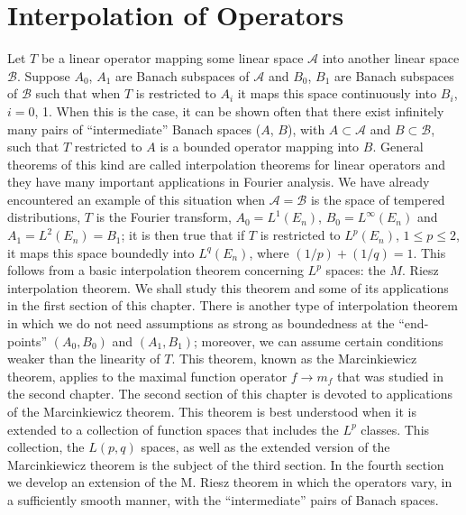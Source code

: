 \chapter{Interpolation of Operators}

Let $T$ be a linear operator mapping some linear space $\mathcal{A}$ into
another linear space $\mathcal{B}$. Suppose $A_{0}$, $A_{1}$ are Banach
subspaces of $\mathcal{A}$ and $B_{0}$, $B_{1}$ are Banach subspaces of
$\mathcal{B}$ such that when $T$ is restricted to $A_{i}$ it maps this space
continuously into $B_{i}$, $i = 0$, 1. When this is the case, it can be shown
often that there exist infinitely many pairs of ``intermediate'' Banach spaces
($A$, $B$), with $A \subset \mathcal{A}$ and $B \subset \mathcal{B}$, such that
$T$ restricted to $A$ is a bounded operator mapping into $B$. General theorems
of this kind are called interpolation theorems for linear operators and they
have many important applications in Fourier analysis. We have already
encountered an example of this situation when $\mathcal{A} = \mathcal{B}$ is
the space of tempered distributions, $T$ is the Fourier transform,
$A_{0} = L^{1}(E_{n})$, $B_{0} = L^{\infty}(E_{n})$ and
$A_{1} = L^{2}(E_{n}) = B_{1}$; it is then true that if $T$ is restricted to
$L^{p}(E_{n})$, $1 \leq p \leq 2$, it maps this space boundedly into
$L^{q}(E_{n})$, where $(1/p) + (1/q) = 1$. This follows from a basic
interpolation theorem concerning $L^{p}$ spaces: the $M$. Riesz interpolation
theorem. We shall study this theorem and some of its applications in the first
section of this chapter. There is another type of interpolation theorem in
which we do not need assumptions as strong as boundedness at the
``end-points'' $(A_{0}, B_{0})$ and $(A_{1}, B_{1})$; moreover, we can assume
certain conditions weaker than the linearity of $T$. This theorem, known as the
Marcinkiewicz theorem, applies to the maximal function operator $f \to m_{f}$
that was studied in the second chapter. The second section of this chapter is
devoted to applications of the Marcinkiewicz theorem. This theorem is best
understood when it is extended to a collection of function spaces that
includes the $L^{p}$ classes. This collection, the $L(p, q)$ spaces, as well as
the extended version of the Marcinkiewicz theorem is the subject of the third
section. In the fourth section we develop an extension of the M. Riesz theorem
in which the operators vary, in a sufficiently smooth manner, with the
``intermediate'' pairs of Banach spaces.

